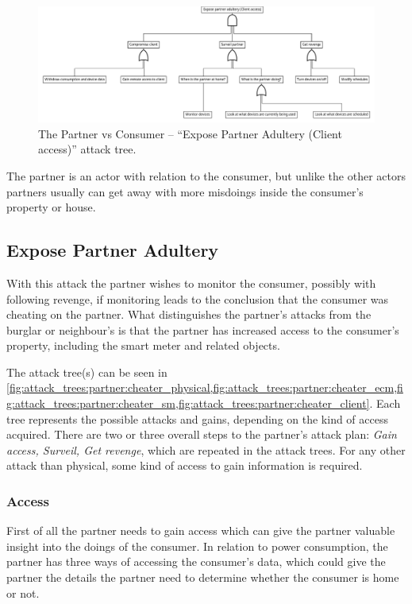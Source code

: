 \begin{figure}[h]
  \includegraphics[angle=90,height=\textheight]{figures/graphviz/partner_vs_consumer_client.pdf}
  \caption{The Partner vs Consumer -- ``Expose Partner Adultery (Client access)'' attack tree.}
  \label{fig:attack_trees:partner:cheater_client}
\end{figure}

The partner is an actor with relation to the consumer, but unlike the other actors partners usually can get away with more misdoings inside the consumer's property or house.

\subsection{Expose Partner Adultery}

With this attack the partner wishes to monitor the consumer, possibly with following revenge, if monitoring leads to the conclusion that the consumer was cheating on the partner.
What distinguishes the partner's attacks from the burglar or neighbour's is that the partner has increased access to the consumer's property, including the smart meter and related objects.

The attack tree(s) can be seen in \cref{fig:attack_trees:partner:cheater_physical,fig:attack_trees:partner:cheater_ecm,fig:attack_trees:partner:cheater_sm,fig:attack_trees:partner:cheater_client}.
Each tree represents the possible attacks and gains, depending on the kind of access acquired.
There are two or three overall steps to the partner's attack plan: \textit{Gain access, Surveil, Get revenge}, which are repeated in the attack trees.
For any other attack than physical, some kind of access to gain information is required.

\subsubsection{Access}
First of all the partner needs to gain access which can give the partner valuable insight into the doings of the consumer.
In relation to power consumption, the partner has three ways of accessing the consumer's data, which could give the partner the details the partner need to determine whether the consumer is home or not.

